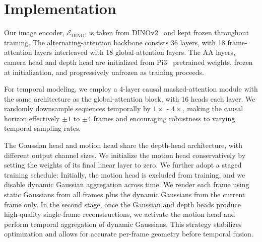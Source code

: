 \section{Implementation}\label{sec:impl}

Our image encoder, $\mathcal{E}_{\text{DINO}}$, is taken from DINOv2~\cite{dino2} and kept frozen throughout training.
The alternating-attention backbone consists 36 layers, with 18 frame-attention layers interleaved with 18 global-attention layers. The AA layers, camera head and depth head are initialized from Pi3~\cite{pi3} pretrained weights, frozen at initialization, and progressively unfrozen as training proceeds.

For temporal modeling, we employ a 4-layer causal masked-attention module with the same architecture as the global-attention block, with 16 heads each layer.
We randomly downsample sequences temporally by $1\times$ - $4\times$, making the causal horizon effectively $\pm1$ to $\pm4$ frames and encouraging robustness to varying temporal sampling rates.

The Gaussian head and motion head share the depth-head architecture, with different output channel sizes. 
We initialize the motion head conservatively by setting the weights of its final linear layer to zero. 
We further adopt a staged training schedule: Initially, the motion head is excluded from training, and we disable dynamic Gaussian aggregation across time. We render each frame using static Gaussians from all frames plus the dynamic Gaussians from the current frame only. 
In the second stage, once the Gaussian and depth heads produce high-quality single-frame reconstructions, we activate the motion head and perform temporal aggregation of dynamic Gaussians. This strategy stabilizes optimization and allows for accurate per-frame geometry before temporal fusion.

\vspace{-0.3cm}